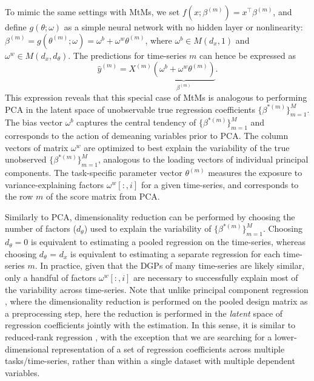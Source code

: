 \documentclass[3p,times,twocolumn]{elsarticle}
\begin{document}
To mimic the same settings with MtMs, we set $f(x;\beta^{(m)})=x^{\top}\beta^{(m)}$, and define $g(\theta;\omega)$ as a simple neural network with no hidden layer or nonlinearity: $\beta^{(m)}=g(\theta^{(m)};\omega)=\omega^{b}+\omega^{w}\theta^{(m)}$, where $\omega^{b} \in M(d_{x},1)$ and $\omega^{w} \in M(d_{x}, d_{\theta})$.
The predictions for time-series $m$ can hence be expressed as
\begin{equation}\label{eq:MtMsOLS}
    \hat{y}^{(m)}= X^{(m)}\underbrace{(\omega^{b}+\omega^{w}\theta^{(m)})}_{\beta^{(m)}}.
\end{equation}
This expression reveals that this special case of MtMs is analogous to performing PCA in the latent space of unobservable true regression coefficients $\{\beta^{*(m)}\}_{m=1}^{M}$.
The bias vector $\omega^{b}$ captures the central tendency of $\{\beta^{*(m)}\}_{m=1}^{M}$ and corresponds to the action of demeaning variables prior to PCA.
The column vectors of matrix $\omega^{w}$ are optimized to best explain the variability of the true unobserved $\{\beta^{*(m)}\}_{m=1}^{M}$, analogous to the loading vectors of individual principal components.
The task-specific parameter vector $\theta^{(m)}$ measures the exposure to variance-explaining factors $\omega^{w}[:,i]$ for a given time-series, and corresponds to the row $m$ of the score matrix from PCA.

Similarly to PCA, dimensionality reduction can be performed by choosing the number of factors ($d_{\theta}$) used to explain the variability of $\{\beta^{*(m)}\}_{m=1}^{M}$.
Choosing $d_{\theta}=0$ is equivalent to estimating a pooled regression on the time-series, whereas choosing $d_{\theta}$ = $d_{x}$ is equivalent to estimating a separate regression for each time-series $m$.
In practice, given that the DGPs of many time-series are likely similar, only a handful of factors $\omega^{w}[:,i]$ are necessary to successfully explain most of the variability across time-series.
Note that unlike principal component regression \citep[see, e.g.,][]{hadiCautionaryNotesUse1998}, where the dimensionality reduction is performed on the pooled design matrix as a preprocessing step, here the reduction is performed in the \emph{latent} space of regression coefficients jointly with the estimation.
In this sense, it is similar to reduced-rank regression \citep{izenmanReducedrankRegressionMultivariate1975}, with the exception that we are searching for a lower-dimensional representation of a set of regression coefficients across multiple tasks/time-series, rather than within a single dataset with multiple dependent variables.
\end{document}
